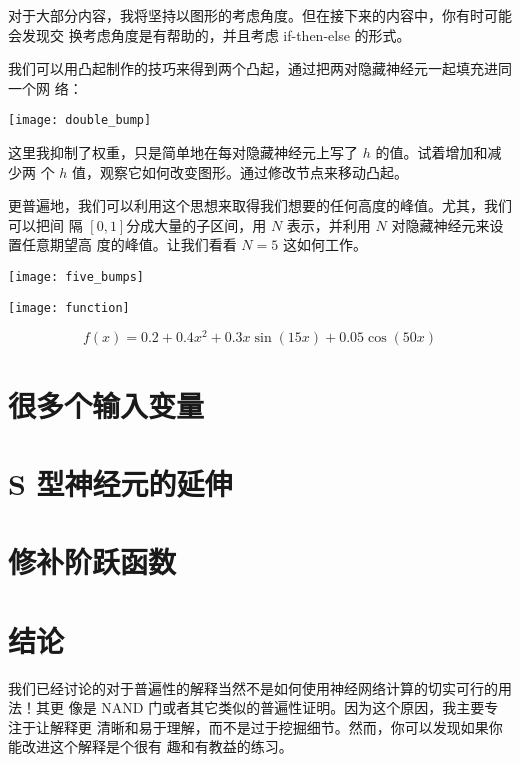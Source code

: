 对于大部分内容，我将坚持以图形的考虑角度。但在接下来的内容中，你有时可能会发现交
换考虑角度是有帮助的，并且考虑 {\serif if-then-else} 的形式。

我们可以用凸起制作的技巧来得到两个凸起，通过把两对隐藏神经元一起填充进同一个网
络：
\begin{center}
  \texttt{[image: double\_bump]}
\end{center}

这里我抑制了权重，只是简单地在每对隐藏神经元上写了 $h$ 的值。试着增加和减少两
个 $h$ 值，观察它如何改变图形。通过修改节点来移动凸起。

更普遍地，我们可以利用这个思想来取得我们想要的任何高度的峰值。尤其，我们可以把间
隔 $[0, 1]$分成大量的子区间，用 $N$ 表示，并利用 $N$ 对隐藏神经元来设置任意期望高
度的峰值。让我们看看 $N = 5$ 这如何工作。
\begin{center}
  \texttt{[image: five\_bumps]}
\end{center}

\begin{center}
  \texttt{[image: function]}
\end{center}

\begin{equation}
f(x) = 0.2+0.4 x^2+0.3x \sin(15 x) + 0.05 \cos(50 x)
\label{eq:113}\tag{113}
\end{equation}

\section{很多个输入变量}
\label{sec:many_input_variables}

\section{S 型神经元的延伸}
\label{sec:extension_beyond_sigmoid_neurons}

\section{修补阶跃函数}
\label{sec:fixing_up_the_step_functions}

\section{结论}
\label{sec:conclusion}

我们已经讨论的对于普遍性的解释当然不是如何使用神经网络计算的切实可行的用法！其更
像是 {\serif NAND} 门或者其它类似的普遍性证明。因为这个原因，我主要专注于让解释更
清晰和易于理解，而不是过于挖掘细节。然而，你可以发现如果你能改进这个解释是个很有
趣和有教益的练习。

